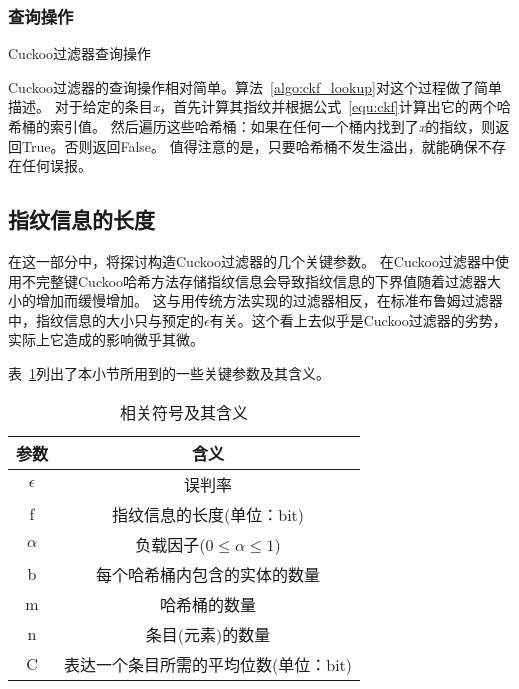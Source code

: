 \subsubsection{查询操作}
\begin{algorithm}[htbp]
\SetAlgoLined
{}
\caption{Cuckoo过滤器查询操作}
\label{algo:ckf_lookup}
\end{algorithm}
Cuckoo过滤器的查询操作相对简单。算法~\ref{algo:ckf_lookup}对这个过程做了简单描述。
对于给定的条目\textit{x}，首先计算其指纹并根据公式~\ref{equ:ckf}计算出它的两个哈希桶的索引值。
然后遍历这些哈希桶：如果在任何一个桶内找到了\textit{x}的指纹，则返回True。否则返回False。
值得注意的是，只要哈希桶不发生溢出，就能确保不存在任何误报。

\subsection{指纹信息的长度}
在这一部分中，将探讨构造Cuckoo过滤器的几个关键参数。
在Cuckoo过滤器中使用不完整键Cuckoo哈希方法存储指纹信息会导致指纹信息的下界值随着过滤器大小的增加而缓慢增加。
这与用传统方法实现的过滤器相反，在标准布鲁姆过滤器中，指纹信息的大小只与预定的$\epsilon$有关。这个看上去似乎是Cuckoo过滤器的劣势，实际上它造成的影响微乎其微。

表~\ref{tab:ckf_para}列出了本小节所用到的一些关键参数及其含义。
\begin{table}[htbp]
  \centering
  \caption{相关符号及其含义}
  \label{tab:ckf_para}
  \begin{tabular}{cc}
    \toprule
      参数  & 含义  \\
    \midrule
      $\epsilon$  					  &   误判率 \\
        f 							  &   指纹信息的长度(单位：bit)\\
      $\alpha$					      &   负载因子($0\leq\alpha\leq 1$) \\
    	b                             &   每个哈希桶内包含的实体的数量 \\
    	m 							  &	  哈希桶的数量 \\
    	n                             &   条目(元素)的数量 \\
        C 							  &   表达一个条目所需的平均位数(单位：bit)\\
    \bottomrule
  \end{tabular}
\end{table}

